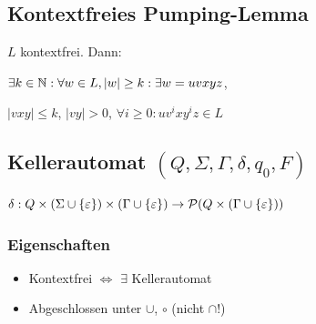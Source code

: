 \subsection*{Kontextfreies Pumping-Lemma}
$L$ kontextfrei. Dann:

$\exists k\in\mathbb{N}: \forall w \in L, |w| \ge k: \exists w = uvxyz$,

$|vxy| \le k$, $|vy| > 0$, $\forall i \ge 0: uv^ixy^iz \in L$

\subsection*{Kellerautomat $(Q,\Sigma,\Gamma,\delta,q_0,F)$}
$\delta: Q \times (\Sigma \cup \{\varepsilon\}) \times (\Gamma \cup \{\varepsilon\}) \to \mathcal{P}(Q \times (\Gamma \cup \{\varepsilon\}))$

\subsubsection*{Eigenschaften}
\begin{itemize}
	\item Kontextfrei $\iff$ $\exists$ Kellerautomat
	\item Abgeschlossen unter $\cup$, $\circ$ (nicht $\cap$!)
\end{itemize}
